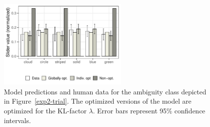 \documentclass[11pt,a4paper]{article}
\newcommand{\gcs}[1]{\textcolor{blue}{[gcs: #1]}}
\begin{document}
\begin{figure}[ht]
	\centering
	\includegraphics[width=2.5in]{images/barplot_x3_withGlobal.pdf}
	\caption{Model predictions and human data for the ambiguity class depicted in Figure~\ref{exp2-trial}.
		The optimized versions of the model are optimized for the KL-factor $\lambda$. Error bars represent 95\% confidence intervals.}\label{barplot_x3}
\end{figure}



\end{document}
